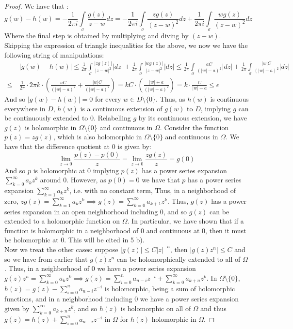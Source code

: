 \documentclass{article}
\begin{document}
\begin{proof}
We have that :
\[
  g(w) - h(w) = -\frac{1}{2\pi i}\int\limits_{\sigma} \frac{g(z)}{z-w}dz = -\frac{1}{2\pi i}\int\limits_{\sigma} \frac{zg(z)}{(z-w)^{2}}dz + \frac{1}{2\pi i}\int\limits_{\sigma} \frac{wg(z)}{(z-w)^{2}}dz  
\]
Where the final step is obtained by multiplying and diving by $(z-w)$. Skipping the expression of triangle inequalities for the above, we now we have the following string of manipulations:
\begin{align*}
  & |g(w) - h(w)| \leq \frac{1}{2\pi}\int\limits_{\sigma} \frac{|zg(z)|}{|z-w|^{2}}|dz| + \frac{1}{2\pi}\int\limits_{\sigma}\frac{|wg(z)|}{|z-w|^{2}}|dz| \leq \frac{1}{2 \pi} \int\limits_{\sigma} \frac{aC}{(|w|-a)^{2}} |dz| +  \frac{1}{2\pi}\int\limits_{\sigma} \frac{|w|C}{(|w|-a)^{2}} |dz| \\
  \leq \ & \frac{1}{2\pi} \cdot 2\pi k \cdot\left(\frac{aC}{(|w| - a)^{2}} + \frac{|w|C}{(|w|-a)^{2}}\right) = kC \cdot \left(\frac{|w| + a}{(|w| - a)^{2}}\right) = k \cdot \frac{C}{|w| - a} \leq \epsilon 
\end{align*}
And so $|g(w) - h(w)| = 0$ for every $w \in D \setminus \{0\}$. Thus, as $h(w)$ is continuous everywhere in $D$, $h(w)$ is a continuous extension of $g(w)$ to $D$, implying $g$ can be continuously extended to $0$.
Relabelling $g$ by its continuous extension, we have $g(z)$ is holomorphic in $\Omega \setminus \{0\}$ and continuous in $\Omega$. Consider the function $p(z) = zg(z)$, which is also holomorphic in $\Omega \setminus \{0\}$ and continuous in $\Omega$. We have that the difference quotient at $0$ is given by:
\[
  \lim_{z \to 0} \frac{p(z) - p(0)}{z} = \lim_{z \to 0}\frac{zg(z)}{z} = g(0)
\]
And so $p$ is holomorphic at $0$ implying $p(z)$ has a power series expansion $\sum_{k=0}^{\infty}a_{k}z^{k}$ around $0$. However, as $p(0) = 0$ we have that $p$ has a power series expansion $\sum_{k=1}^{\infty}a_{k}z^{k}$, i.e. with no constant term, Thus, in a neighborhood of zero, $zg(z) = \sum_{k=1}^{\infty}a_{k}z^{k} \implies g(z) = \sum_{k=0}^{\infty}a_{k+1}z^{k}$. Thus, $g(z)$ has a power series expansion in an open neighborhood including $0$, and so $g(z)$ can be extended to a holomorphic function on $\Omega$. In particular, we have shown that if a function is holomorphic in a neighborhood of $0$ and continuous at $0$, then it must be holomorphic at $0$. This will be cited in 5 b). \\
Now we treat the other cases: suppose $|g(z)| \leq C|z|^{-n}$, then $|g(z)z^{n} | \leq C$ and so we have from earlier that $g(z)z^{n}$ can be holomorphically extended to all of $\Omega$. Thus, in a neighborhood of $0$ we have a power series expansion $g(z)z^{n} = \sum_{k=0}^{\infty}a_{k}z^{k} \implies g(z) = \sum_{i=0}^{n}a_{n-i}z^{-i} +   \sum_{k=0}^{\infty}a_{k+n}z^{k}$. In $\Omega \setminus \{0\}$, $h(z) = g(z) - \sum_{i=0}^{n}a_{n-i}z^{-i}$ is holomorphic, being a sum of holomorphic functions, and in a neighborhood including $0$ we have a power series expansion given by $ \sum_{k=0}^{\infty}a_{k+n}z^{k}$, and so $h(z)$ is holomorphic on all of $\Omega$ and thus $g(z) = h(z) + \sum_{i=0}^{n}a_{n-i}z^{-i}$ in $\Omega$ for $h(z)$ holomorphic in $\Omega$.
\end{proof}
\end{document}
